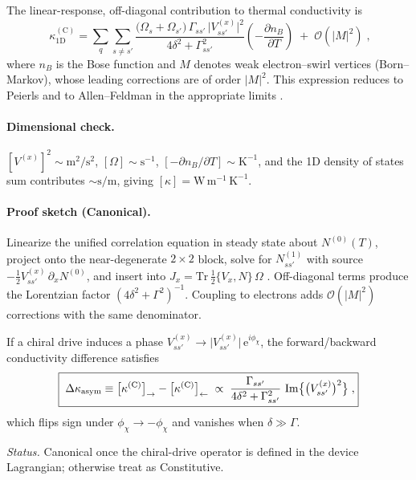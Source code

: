 \documentclass[reprint,aps,onecolumn,nofootinbib]{revtex4-2}
\newcommand{\ee}{\mathrm{e}}
\begin{document}
    \begin{corollary}
    \label{cor:kappaC1D}
    The linear-response, off-diagonal contribution to thermal conductivity is
    \begin{equation}
    \boxed{\;\kappa^{(\mathrm C)}_{1\mathrm D}
    =\sum_{q}\sum_{s\neq s'}\frac{\big(\Omega_s+\Omega_{s'}\big)\,\Gamma_{ss'}\,\big|V^{(x)}_{ss'}\big|^2}{4\delta^2+\Gamma_{ss'}^2}
    \left(-\frac{\partial n_B}{\partial T}\right)
    \; +\; \mathcal O(|M|^2)\;,}
    \end{equation}
    where $n_B$ is the Bose function and $M$ denotes weak electron–swirl vertices (Born–Markov), whose leading corrections are of order $|M|^2$. This expression reduces to Peierls and to Allen–Feldman in the appropriate limits \cite{Peierls1929,AllenFeldman1993,Simoncelli2019Unified,Hardy1963}.
    \end{corollary}


    \paragraph{Dimensional check.} $[V^{(x)}]^2\sim\mathrm{m^2/s^2}$, $[\Omega]\sim\mathrm{s^{-1}}$, $[-\partial n_B/\partial T]\sim\mathrm{K^{-1}}$, and the 1D density of states sum contributes $\sim \mathrm{s/m}$, giving $[\kappa]=\mathrm{W\,m^{-1}\,K^{-1}}$.


    \paragraph{Proof sketch (Canonical).} Linearize the unified correlation equation \cite{Simoncelli2019Unified} in steady state about $N^{(0)}(T)$, project onto the near-degenerate $2\times2$ block, solve for $N^{(1)}_{ss'}$ with source $-\tfrac12 V^{(x)}_{ss'}\,\partial_x N^{(0)}$, and insert into $J_x=\mathrm{Tr}\,\tfrac12\{V_x, N\}\,\Omega$ \cite{Hardy1963}. Off-diagonal terms produce the Lorentzian factor $(4\delta^2+\Gamma^2)^{-1}$. Coupling to electrons adds $\mathcal O(|M|^2)$ corrections with the same denominator.


    \begin{corollary}
    \label{cor:nonrec}
    If a chiral drive induces a phase $V^{(x)}_{ss'}\to \big|V^{(x)}_{ss'}\big|\,\ee^{i\phi_\chi}$, the forward/backward conductivity difference satisfies
    \begin{equation}
    \boxed{\;\Delta\kappa_{\rm asym}\equiv \big[\kappa^{(\mathrm C)}\big]_{\rightarrow}-\big[\kappa^{(\mathrm C)}\big]_{\leftarrow}
    \;\propto\;\frac{\Gamma_{ss'}}{4\delta^2+\Gamma_{ss'}^2}\,\Im\!\big\{\big(V^{(x)}_{ss'}\big)^2\big\}\;,}
    \end{equation}
    which flips sign under $\phi_\chi\to-\phi_\chi$ and vanishes when $\delta\gg\Gamma$.
    \end{corollary}
    \emph{Status.} Canonical once the chiral-drive operator is defined in the device Lagrangian; otherwise treat as Constitutive.
\end{document}
